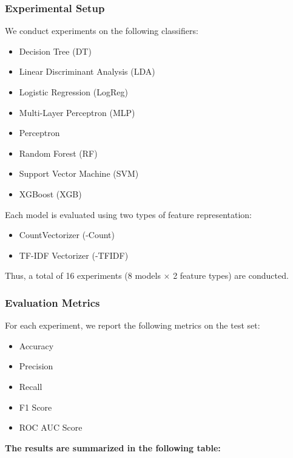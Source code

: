 \subsubsection{Experimental Setup}

We conduct experiments on the following classifiers:
\begin{itemize}
    \item Decision Tree (DT)
    \item Linear Discriminant Analysis (LDA)
    \item Logistic Regression (LogReg)
    \item Multi-Layer Perceptron (MLP)
    \item Perceptron
    \item Random Forest (RF)
    \item Support Vector Machine (SVM)
    \item XGBoost (XGB)
\end{itemize}

Each model is evaluated using two types of feature representation:
\begin{itemize}
    \item CountVectorizer (-Count)
    \item TF-IDF Vectorizer (-TFIDF)
\end{itemize}

Thus, a total of 16 experiments (8 models $\times$ 2 feature types) are conducted.

\subsubsection{Evaluation Metrics}

For each experiment, we report the following metrics on the test set:
\begin{itemize}
    \item Accuracy
    \item Precision
    \item Recall
    \item F1 Score
    \item ROC AUC Score
\end{itemize}

\textbf{The results are summarized in the following table:}


